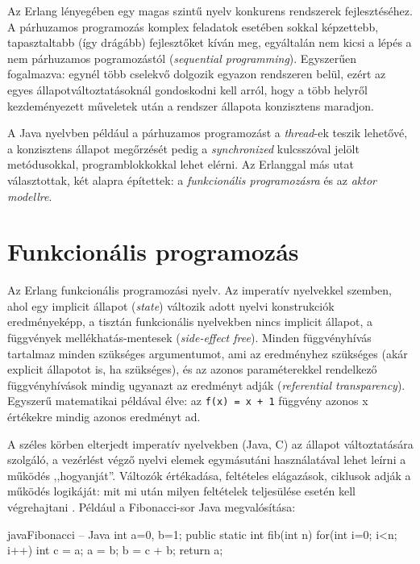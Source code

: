 \documentclass[12pt, a4paper, oneside]{book}
\begin{document}
Az Erlang lényegében egy magas szintű nyelv konkurens rendszerek
fejlesztéséhez. A párhuzamos programozás komplex feladatok esetében sokkal
képzettebb, tapasztaltabb (így drágább) fejlesztőket kíván meg, egyáltalán nem
kicsi a lépés a nem párhuzamos pogramozástól (\emph{sequential programming}).
Egyszerűen fogalmazva: egynél több cselekvő dolgozik egyazon rendszeren belül,
ezért az egyes állapotváltoztatásoknál gondoskodni kell arról, hogy a több
helyről kezdeményezett műveletek után a rendszer állapota konzisztens maradjon.

A Java nyelvben például a párhuzamos programozást a \emph{thread}-ek teszik
lehetővé, a konzisztens állapot megőrzését pedig a \emph{synchronized}
kulcsszóval jelölt metódusokkal, programblokkokkal lehet elérni. Az Erlanggal
más utat választottak, két alapra építettek: a \emph{funkcionális
programozásra} és az \emph{aktor modellre}.
 
\section{Funkcionális programozás} 

Az Erlang funkcionális programozási nyelv. Az imperatív nyelvekkel szemben,
ahol egy implicit állapot (\emph{state}) változik adott nyelvi konstrukciók
eredményeképp, a tisztán funkcionális nyelvekben nincs implicit állapot, a
függvények mellékhatás-mentesek (\emph{side-effect free}). Minden függvényhívás
tartalmaz minden szükséges argumentumot, ami az eredményhez szükséges (akár
explicit állapotot is, ha szükséges), és az azonos paraméterekkel rendelkező
függvényhívások mindig ugyanazt az eredményt adják (\emph{referential
transparency}). Egyszerű matematikai példával élve: az \texttt{f(x) = x + 1}
függvény azonos x értékekre mindig azonos eredményt ad.

A széles körben elterjedt imperatív nyelvekben (Java, C) az állapot
változtatására szolgáló, a vezérlést végző nyelvi elemek egymásutáni
használatával lehet leírni a működés ,,hogyanját''. Változók értékadása,
feltételes elágazások, ciklusok adják a működés logikáját: mit mi után milyen
feltételek teljesülése esetén kell végrehajtani \citep{Hudak}. Például a Fibonacci-sor Java
megvalósítása:

\begin{code}{java}{Fibonacci -- Java}
int a=0, b=1;
public static int fib(int n) {
  for(int i=0; i<n; i++) {
    int c = a;
    a = b;
    b = c + b;
  }
  return a;
}
\end{code}
\end{document}
